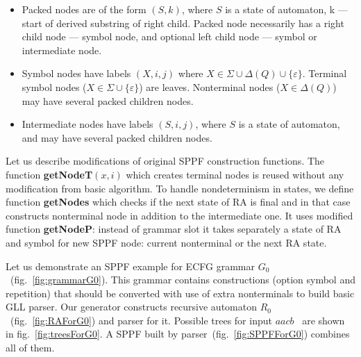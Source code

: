 \documentclass[runningheads,a4paper]{llncs}
\begin{document}
\begin{itemize}
\item Packed nodes are of the form $(S, k)$, where $S$ is a state of automaton, k --- start of derived substring of right child.
Packed node necessarily has a right child node --- symbol node, and optional left child node --- symbol or intermediate node.
\item Symbol nodes have labels $(X, i, j)$ where $X \in \Sigma \cup \Delta(Q) \cup \{\varepsilon\}$.
Terminal symbol nodes ($X \in \Sigma \cup \{\varepsilon\}$) are leaves. 
Nonterminal nodes ($X \in \Delta(Q)$) may have several packed children nodes. 
\item Intermediate nodes have labels $ (S, i, j) $, where $S$ is a state of automaton, and may have several packed children nodes. 
\end{itemize}

Let us describe modifications of original SPPF construction functions.
The function \textbf{getNodeT$(x,i)$} which creates terminal nodes is reused without any modification from basic algorithm.
To handle nondeterminism in states, we define function \textbf{getNodes} which checks if the next state of RA
is final and in that case constructs nonterminal node in addition to the intermediate one.
It uses modified function \textbf{getNodeP}: instead of grammar slot it takes separately a 
state of RA and symbol for new SPPF node: current nonterminal or the next RA state.




Let us demonstrate an SPPF example for ECFG grammar $G_0$~(fig.~\ref{fig:grammarG0}).
This grammar contains constructions (option symbol and repetition) that should be converted
with use of extra nonterminals to build basic GLL parser.
Our generator constructs recursive automaton $R_0$~(fig.~\ref{fig:RAForG0}) and parser for it.
Possible trees for input $aacb$ \ are shown in fig.~\ref{fig:treesForG0}.
A SPPF built by parser~(fig.~\ref{fig:SPPFForG0}) combines all of them.
\end{document}
